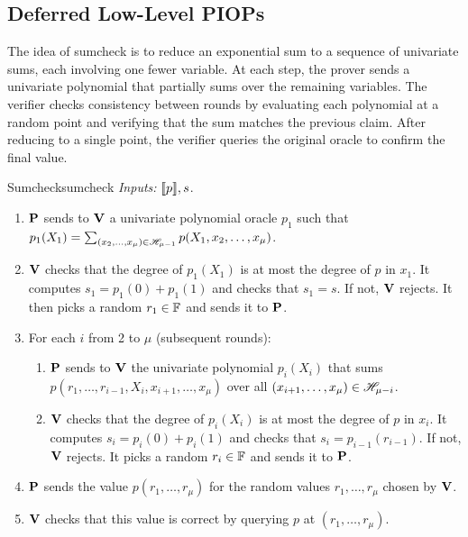 \subsection{Deferred Low-Level PIOPs}
\label{sec:low-level-piops-deferred}

The idea of sumcheck is to reduce an exponential sum to a sequence of univariate sums, each involving one fewer variable. At each step, the prover sends a univariate polynomial that partially sums over the remaining variables. The verifier checks consistency between rounds by evaluating each polynomial at a random point and verifying that the sum matches the previous claim. After reducing to a single point, the verifier queries the original oracle to confirm the final value.

\begin{DefinePIOP}{Sumcheck}{sumcheck}
  \emph{Inputs:} $\llbracket p\rrbracket, s$.
  \begin{enumerate}[nosep]
	    \item $\bf{P}$ sends to $\bf{V}$ a univariate polynomial oracle $p_1$ such that $
	      p_1(X_1) = \sum_{(x_2, \dots, x_\mu) \in \mathscr{H}_{\mu-1}} p(X_1, x_2, \dots, x_\mu)$.
    \item $\bf{V}$ checks that the degree of $p_1(X_1)$ is at most the degree of $ p $ in $ x_1 $. It computes $ s_1 = p_1(0) + p_1(1) $ and checks that $ s_1 = s $. If not, $\bf{V}$ rejects. It then picks a random $ r_1 \in \mathbb{F} $ and sends it to $\bf{P}$.
    \item For each $ i $ from 2 to $ \mu $ (subsequent rounds):
    \begin{enumerate}[noitemsep, topsep=0pt]
	      \item $\bf{P}$ sends to $\bf{V}$ the univariate polynomial
	            $p_i(X_i)$ that sums $p(r_1, \dots, r_{i-1}, X_i, x_{i+1}, \dots, x_\mu)$ over all $(x_{i+1}, \dots, x_\mu) \in \mathscr{H}_{\mu-i}$.
      \item $\bf{V}$ checks that the degree of $p_i(X_i)$ is at most the degree of $ p $ in $ x_i $. It computes $ s_i = p_i(0) + p_i(1) $ and checks that $ s_i = p_{i-1}(r_{i-1}) $. If not, $\bf{V}$ rejects. It picks a random $ r_i \in \mathbb{F} $ and sends it to $\bf{P}$.
    \end{enumerate}
    \item $\bf{P}$ sends the value $ p(r_1, \dots, r_\mu) $ for the random values $ r_1, \dots, r_\mu $ chosen by $\bf{V}$.
    \item $\bf{V}$ checks that this value is correct by querying $p$ at $(r_1, \dots, r_\mu)$.
  \end{enumerate}
\end{DefinePIOP}


